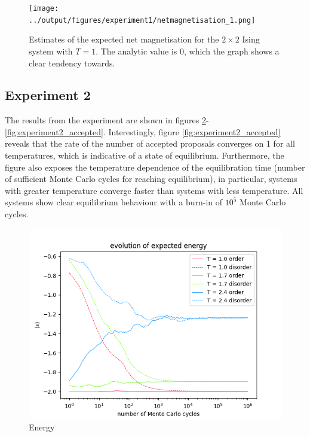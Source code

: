 \documentclass[nofootinbib,reprint,english]{revtex4-1}
\begin{document}
\begin{figure}
\centering
\texttt{[image: ../output/figures/experiment1/netmagnetisation\_1.png]}
\caption{Estimates of the expected net magnetisation for the \(2\times2\) Ising system with \(T=1\). The analytic value is 0, which the graph shows a clear tendency towards.}\label{fig:2by2_expected_netmagnetisation}
\end{figure}


\subsection{Experiment 2}
The results from the experiment are shown in figures \ref{fig:experiment2_energy}-\ref{fig:experiment2_accepted}. Interestingly, figure \ref{fig:experiment2_accepted} reveals that the rate of the number of accepted proposals converges on 1 for all temperatures, which is indicative of a state of equilibrium. Furthermore, the figure also exposes the temperature dependence of the equilibration time (number of sufficient Monte Carlo cycles for reaching equilibrium), in particular, systems with greater temperature converge faster than systems with less temperature. All systems show clear equilibrium behaviour with a burn-in of \(10^5\) Monte Carlo cycles.


\begin{figure}
\centering
\includegraphics[scale=0.5]{../output/figures/experiment2/energy.png}
\caption{Energy}\label{fig:experiment2_energy}
\end{figure}
\end{document}
